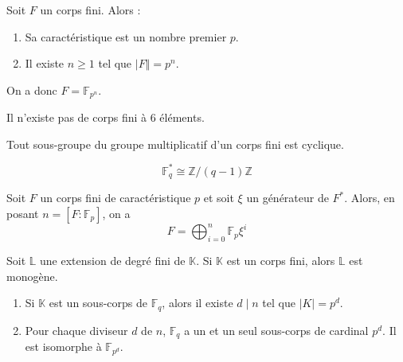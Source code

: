 
  \begin{theorem}
    Soit $F$ un corps fini. Alors :
    \begin{enumerate}[label={\bfseries(\roman*)}]
      \item Sa caractéristique est un nombre premier $p$.
      \item Il existe $n \geq 1$ tel que $\vert F \Vert = p^n$.
    \end{enumerate}
    On a donc $F = \mathbb{F}_{p^n}$.
  \end{theorem}

  \begin{example}
    Il n'existe pas de corps fini à $6$ éléments.
  \end{example}

  \begin{theorem}
    Tout sous-groupe du groupe multiplicatif d'un corps fini est cyclique.
  \end{theorem}

  \begin{corollary}
    \[ \mathbb{F}_q^* \cong \mathbb{Z}/(q-1)\mathbb{Z} \]
  \end{corollary}

  \begin{proposition}
    Soit $F$ un corps fini de caractéristique $p$ et soit $\xi$ un générateur de $F^*$. Alors, en posant $n = [F:\mathbb{F}_p]$, on a
    \[ F = \bigoplus_{i=0}^n \mathbb{F}_p \xi^i \]
  \end{proposition}

  \begin{theorem}
    Soit $\mathbb{L}$ une extension de degré fini de $\mathbb{K}$. Si $\mathbb{K}$ est un corps fini, alors $\mathbb{L}$ est monogène.
  \end{theorem}


  \begin{theorem}
    \begin{enumerate}[label={\bfseries(\roman*)}]
      \item Si $\mathbb{K}$ est un sous-corps de $\mathbb{F}_q$, alors il existe $d \mid n$ tel que $\vert K \vert = p^d$.
      \item Pour chaque diviseur $d$ de $n$, $\mathbb{F}_q$ a un et un seul sous-corps de cardinal $p^d$. Il est isomorphe à $\mathbb{F}_{p^d}$.
    \end{enumerate}
  \end{theorem}

